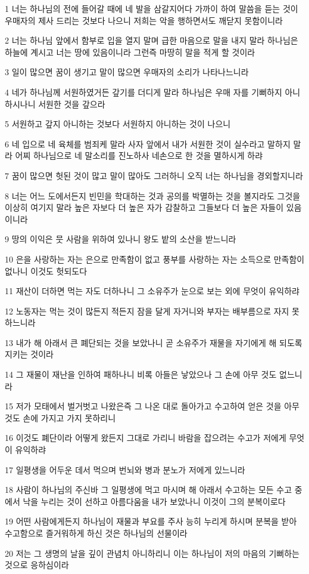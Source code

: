 \par 1 너는 하나님의 전에 들어갈 때에 네 발을 삼갈지어다 가까이 하여 말씀을 듣는 것이 우매자의 제사 드리는 것보다 나으니 저희는 악을 행하면서도 깨닫지 못함이니라
\par 2 너는 하나님 앞에서 함부로 입을 열지 말며 급한 마음으로 말을 내지 말라 하나님은 하늘에 계시고 너는 땅에 있음이니라 그런즉 마땅히 말을 적게 할 것이라
\par 3 일이 많으면 꿈이 생기고 말이 많으면 우매자의 소리가 나타나느니라
\par 4 네가 하나님께 서원하였거든 갚기를 더디게 말라 하나님은 우매 자를 기뻐하지 아니하시나니 서원한 것을 갚으라
\par 5 서원하고 갚지 아니하는 것보다 서원하지 아니하는 것이 나으니
\par 6 네 입으로 네 육체를 범죄케 말라 사자 앞에서 내가 서원한 것이 실수라고 말하지 말라 어찌 하나님으로 네 말소리를 진노하사 네손으로 한 것을 멸하시게 하랴
\par 7 꿈이 많으면 헛된 것이 많고 말이 많아도 그러하니 오직 너는 하나님을 경외할지니라
\par 8 너는 어느 도에서든지 빈민을 학대하는 것과 공의를 박멸하는 것을 볼지라도 그것을 이상히 여기지 말라 높은 자보다 더 높은 자가 감찰하고 그들보다 더 높은 자들이 있음이니라
\par 9 땅의 이익은 뭇 사람을 위하여 있나니 왕도 밭의 소산을 받느니라
\par 10 은을 사랑하는 자는 은으로 만족함이 없고 풍부를 사랑하는 자는 소득으로 만족함이 없나니 이것도 헛되도다
\par 11 재산이 더하면 먹는 자도 더하나니 그 소유주가 눈으로 보는 외에 무엇이 유익하랴
\par 12 노동자는 먹는 것이 많든지 적든지 잠을 달게 자거니와 부자는 배부름으로 자지 못하느니라
\par 13 내가 해 아래서 큰 폐단되는 것을 보았나니 곧 소유주가 재물을 자기에게 해 되도록 지키는 것이라
\par 14 그 재물이 재난을 인하여 패하나니 비록 아들은 낳았으나 그 손에 아무 것도 없느니라
\par 15 저가 모태에서 벌거벗고 나왔은즉 그 나온 대로 돌아가고 수고하여 얻은 것을 아무 것도 손에 가지고 가지 못하리니
\par 16 이것도 폐단이라 어떻게 왔든지 그대로 가리니 바람을 잡으려는 수고가 저에게 무엇이 유익하랴
\par 17 일평생을 어두운 데서 먹으며 번뇌와 병과 분노가 저에게 있느니라
\par 18 사람이 하나님의 주신바 그 일평생에 먹고 마시며 해 아래서 수고하는 모든 수고 중에서 낙을 누리는 것이 선하고 아름다움을 내가 보았나니 이것이 그의 분복이로다
\par 19 어떤 사람에게든지 하나님이 재물과 부요를 주사 능히 누리게 하시며 분복을 받아 수고함으로 즐거워하게 하신 것은 하나님의 선물이라
\par 20 저는 그 생명의 날을 깊이 관념치 아니하리니 이는 하나님이 저의 마음의 기뻐하는 것으로 응하심이라

